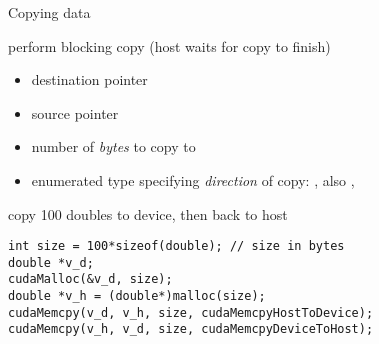 \begin{frame}[fragile]{Copying data}

    \begin{info}{perform blocking copy (host waits for copy to finish)}
        \centering {}
    \begin{itemize}
        \item {} destination pointer
        \item {} source pointer
        \item {} number of \emph{bytes} to copy to 
        \item {} enumerated type specifying \emph{direction} of copy:
            , also , 
    \end{itemize}
    \end{info}

    \begin{code}{copy 100 doubles to device, then back to host}
        \begin{lstlisting}[style=boxcuda]
int size = 100*sizeof(double); // size in bytes
double *v_d;
cudaMalloc(&v_d, size);
double *v_h = (double*)malloc(size);
cudaMemcpy(v_d, v_h, size, cudaMemcpyHostToDevice);
cudaMemcpy(v_h, v_d, size, cudaMemcpyDeviceToHost);
\end{lstlisting}
    \end{code}
\end{frame}

